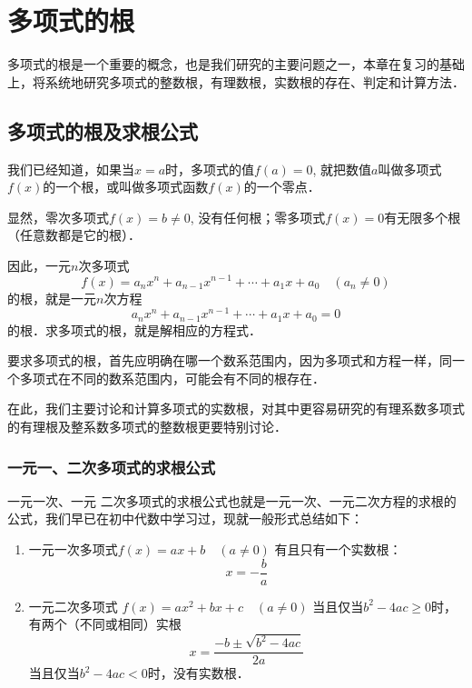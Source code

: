 \chapter{多项式的根}
多项式的根是一个重要的概念，也是我们研究的主要问题之一，本章在复习的基础上，将系统地研究多项式的整数根，有理数根，实数根的存在、判定和计算方法．

\section{多项式的根及求根公式}
我们已经知道，如果当$x=a$时，多项式的值$f(a)=0$, 就把数值$a$叫做多项式$f(x)$的一个根，或叫做多项式函数$f(x)$的一个零点．

显然，零次多项式$f(x)=b\ne 0$, 没有任何根；零多项式$f(x)=0$有无限多个根（任意数都是它的根）．

因此，一元$n$次多项式
\[f(x)=a_nx^n+a_{n-1}x^{n-1}+\cdots+a_1x+a_0\quad (a_n\ne 0)\]
的根，就是一元$n$次方程
\[a_nx^n+a_{n-1}x^{n-1}+\cdots+a_1x+a_0=0\]
的根．求多项式的根，就是解相应的方程式．

要求多项式的根，首先应明确在哪一个数系范围内，因为多项式和方程一样，同一个多项式在不同的数系范围内，可能会有不同的根存在．

在此，我们主要讨论和计算多项式的实数根，对其中更容易研究的有理系数多项式的有理根及整系数多项式的整数根更要特别讨论．

\subsection{一元一、二次多项式的求根公式}

一元一次、一元
二次多项式的求根公式也就是一元一次、一元二次方程的求根的公式，我们早已在初中代数中学习过，现就一般形式总结如下：

\begin{enumerate}
    \item 一元一次多项式$  f (x) =ax+b\quad  (a\ne 0)$
    有且只有一个实数根：
    \begin{equation}
        x=-\frac{b}{a}
    \end{equation}
    \item 一元二次多项式
    $f (x) =ax^2+bx+c\quad  (a\ne0)$
    当且仅当$b^2-4ac\ge 0$时，有两个（不同或相同）实根
    \begin{equation}
        x=\frac{-b\pm\sqrt{b^2-4ac}}{2a}
    \end{equation}
    当且仅当$b^2-4ac<0$时，没有实数根．
\end{enumerate}

